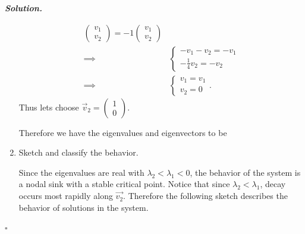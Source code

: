 \documentclass[12pt]{report}
\newenvironment{solution}[1][\it{Solution}]{\textbf{#1. } }{$\square$}
\newcommand*\widefbox[1]{\fbox{#1}}
\begin{document}
\begin{solution}
\begin{enumerate}
\begin{align*}
\begin{pmatrix}
                v_1\\
                v_2
            \end{pmatrix} = -1 \begin{pmatrix}
                v_1\\
                v_2
            \end{pmatrix}\\
            \implies & \begin{cases}
                -v_1 - v_2 = - v_1\\
                -\frac{1}{4}v_2 = -v_2
            \end{cases}\\
            \implies &\begin{cases}
                v_1 = v_1\\
                v_2 = 0
            \end{cases}.
        \end{align*}
        Thus lets choose $\vec{v}_2 = \begin{pmatrix}
            1\\
            0
        \end{pmatrix}$.
        
        Therefore we have the eigenvalues and eigenvectors to be


        \item [{\bf Part b:}] Sketch and classify the behavior.
        
        \noindent
        Since the eigenvalues are real with $\lambda_2 < \lambda_1 < 0$, the behavior of the system is a nodal sink with a stable critical point. Notice that since $\lambda_2 < \lambda_1$, decay occurs most rapidly along $\vec{v_2}$. Therefore the following sketch describes the behavior of solutions in the system. 



\end{enumerate}
\end{solution}
\end{document}
